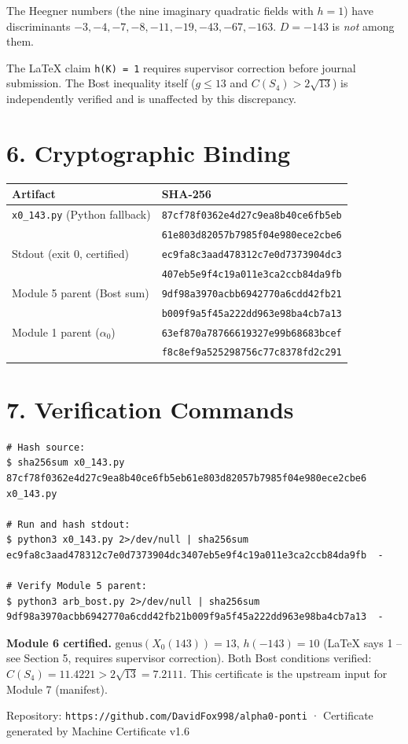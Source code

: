 \documentclass[11pt,letterpaper]{article}
\begin{document}
The Heegner numbers (the nine imaginary quadratic fields with $h = 1$) have
discriminants $-3, -4, -7, -8, -11, -19, -43, -67, -163$.
$D = -143$ is \emph{not} among them.

The LaTeX claim \texttt{h(K) = 1} requires supervisor correction before journal
submission. The Bost inequality itself ($g \leq 13$ and $C(S_4) > 2\sqrt{13}$)
is independently verified and is unaffected by this discrepancy.

\section*{6. Cryptographic Binding}

\begin{center}
\begin{tabular}{|l|l|}
\hline
\textbf{Artifact} & \textbf{SHA-256} \\
\hline
\texttt{x0\_143.py} (Python fallback) & \texttt{87cf78f0362e4d27c9ea8b40ce6fb5eb} \\
 & \texttt{61e803d82057b7985f04e980ece2cbe6} \\
\hline
Stdout (exit 0, certified) & \texttt{ec9fa8c3aad478312c7e0d7373904dc3} \\
 & \texttt{407eb5e9f4c19a011e3ca2ccb84da9fb} \\
\hline
Module 5 parent (Bost sum) & \texttt{9df98a3970acbb6942770a6cdd42fb21} \\
 & \texttt{b009f9a5f45a222dd963e98ba4cb7a13} \\
\hline
Module 1 parent ($\alpha_0$) & \texttt{63ef870a78766619327e99b68683bcef} \\
 & \texttt{f8c8ef9a525298756c77c8378fd2c291} \\
\hline
\end{tabular}
\end{center}

\section*{7. Verification Commands}

\begin{lstlisting}
# Hash source:
$ sha256sum x0_143.py
87cf78f0362e4d27c9ea8b40ce6fb5eb61e803d82057b7985f04e980ece2cbe6  x0_143.py

# Run and hash stdout:
$ python3 x0_143.py 2>/dev/null | sha256sum
ec9fa8c3aad478312c7e0d7373904dc3407eb5e9f4c19a011e3ca2ccb84da9fb  -

# Verify Module 5 parent:
$ python3 arb_bost.py 2>/dev/null | sha256sum
9df98a3970acbb6942770a6cdd42fb21b009f9a5f45a222dd963e98ba4cb7a13  -
\end{lstlisting}

\vspace{0.5em}
\noindent\textbf{Module 6 certified.}
$\mathrm{genus}(X_0(143)) = 13$, $h(-143) = 10$ (LaTeX says 1 -- see Section 5,
requires supervisor correction).
Both Bost conditions verified: $C(S_4) = 11.4221 > 2\sqrt{13} = 7.2111$.
This certificate is the upstream input for Module 7 (manifest).

\vspace{0.5em}
\noindent\small Repository: \texttt{https://github.com/DavidFox998/alpha0-ponti} ·
Certificate generated by Machine Certificate v1.6
\end{document}
